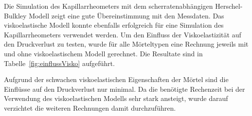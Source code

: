 Die Simulation des Kapillarrheometers mit dem scherratenabhängigen \linebreak Herschel-Bulkley Modell zeigt eine gute Übereinstimmung mit den Messdaten.
Das viskoelastische Modell konnte ebenfalls erfolgreich für eine Simulation des Kapillarrheometers verwendet werden.
Um den Einfluss der Viskoelastizität auf den Druckverlust zu testen, wurde für alle Mörteltypen eine Rechnung jeweils mit und ohne viskoelastischem Modell gerechnet. Die Resultate sind in Tabelle~\ref{fig:einflussVisko} aufgeführt.
%
\begin{table}[bt]
\noindent{}
    \caption{Der Einfluss der Viskoelastizität auf den Druckverlust. In der oberen Zeile die Simulationen mit den rein scherratenabhängigen Modellen, unten mit berücksichtigter Viskoelastizität. Für die Simulation wurde das Kapillarrheometer mit \SI{2}{mm} Kapillare und einer Einlassgeschwindigkeit von \SI{0.13}{mm.s^{-1}} verwendet.}
    \label{fig:einflussVisko}
\end{table}

Aufgrund der schwachen viskoelastischen Eigenschaften der Mörtel sind die Einflüsse auf den Druckverlust nur minimal. Da die benötigte Rechenzeit bei der Verwendung des viskoelastischen Modells sehr stark ansteigt, wurde darauf verzichtet die weiteren Rechnungen damit durchzuführen.
